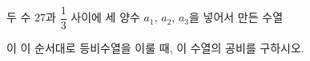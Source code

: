 두 수 $27$과 $\dfrac{1}{3}$ 사이에 세 양수 $a_1$, $a_2$, $a_3$을 넣어서 만든 수열\par\smallskip{}\par\smallskip\noindent 이 이 순서대로 등비수열을 이룰 때, 이 수열의 공비를 구하시오.
